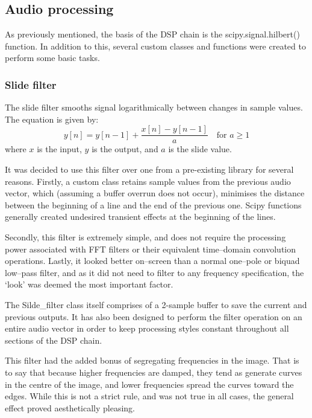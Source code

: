 \documentclass[11pt]{article}
\begin{document}
\subsection{Audio processing}
As previously mentioned, the basis of the DSP chain is the scipy.signal.hilbert() function. In addition to this, several custom classes and functions were created to perform some basic tasks.
\subsubsection{Slide filter}
\label{sec:filter}
The slide filter smooths signal logarithmically between changes in sample values\cite{slide}. The equation is given by:
\begin{equation}
y[n] = y[n-1]+\frac{x[n]-y[n-1]}{a} \quad \textrm{for } a\ge1
\end{equation}
where $x$ is the input, $y$ is the output, and $a$ is the slide value.

It was decided to use this filter over one from a pre-existing library for several reasons. Firstly, a custom class retains sample values from the previous audio vector, which (assuming a buffer overrun does not occur), minimises the distance between the beginning of a line and the end of the previous one. Scipy functions generally created undesired transient effects at the beginning of the lines.

Secondly, this filter is extremely simple, and does not require the processing power associated with FFT filters or their equivalent time--domain convolution operations. Lastly, it looked better on--screen than a normal one--pole or biquad low--pass filter, and as it did not need to filter to any frequency specification, the `look' was deemed the most important factor.

The Silde\_filter class itself comprises of a 2-sample buffer to save the current and previous outputs. It has also been designed to perform the filter operation on an entire audio vector in order to keep processing styles constant throughout all sections of the DSP chain.

This filter had the added bonus of segregating frequencies in the image. That is to say that because higher frequencies are damped, they tend as generate curves in the centre of the image, and lower frequencies spread the curves toward the edges. While this is not a strict rule, and was not true in all cases, the general effect proved aesthetically pleasing.
\end{document}
